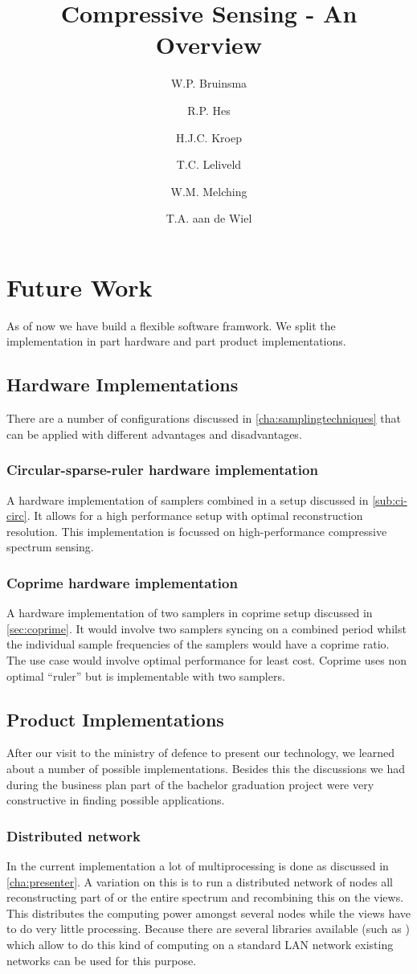 \documentclass[a4paper, openany, oneside]{memoir}
\title{Compressive Sensing - An Overview}
\author{W.P. Bruinsma \and R.P. Hes \and H.J.C. Kroep \and T.C. Leliveld \and W.M. Melching \and T.A. aan de Wiel}
\begin{document}
\chapter{Future Work}
As of now we have build a flexible software framwork. We split the implementation in part hardware and part product implementations.

\section{Hardware Implementations}
\label{sec:hardware_implementations}
There are a number of configurations discussed in \cref{cha:samplingtechniques} that can be applied with different advantages and disadvantages.

\subsection{Circular-sparse-ruler hardware implementation}
\label{sub:minimal_sparse_ruler_hardware_implementation}
A hardware implementation of samplers combined in a setup discussed in \cref{sub:ci-circ}. It allows for a high performance setup with optimal reconstruction resolution. This implementation is focussed on high-performance compressive spectrum sensing.

\subsection{Coprime hardware implementation}
\label{sub:coprime_hardwa}
A hardware implementation of two samplers in coprime setup discussed in \cref{sec:coprime}. It would involve two samplers syncing on a combined period whilst the individual sample frequencies of the samplers would have a coprime ratio. The use case would involve optimal performance for least cost. Coprime uses non optimal ``ruler'' but is implementable with two samplers.

\section{Product Implementations}
\label{sec:product_implementations}
After our visit to the ministry of defence to present our technology, we learned about a number of possible implementations. Besides this the discussions we had during the business plan part of the bachelor graduation project were very constructive in finding possible applications.

\subsection{Distributed network}
\label{sec:distributed}
In the current implementation a lot of multiprocessing is done as discussed in \cref{cha:presenter}. A variation on this is to run a distributed network of nodes all reconstructing part of or the entire spectrum and recombining this on the views. This distributes the computing power amongst several nodes while the views  have to do very little processing. Because there are several libraries available (such as ) which allow to do this kind of computing on a standard LAN network existing networks can be used for this purpose.
\end{document}
